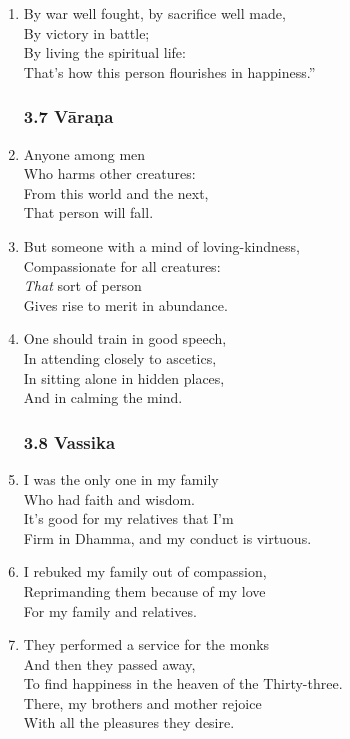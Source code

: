 \documentclass[10pt, openany]{book}
\newcommand*{\vleftofline}[1]{\leavevmode\llap{#1}}
\begin{document}
\begin{enumerate}
\item \vleftofline{“}By war well fought, by sacrifice well made,\\
By victory in battle;\\
By living the spiritual life:\\
That’s how this person flourishes in happiness.”

\subsubsection*{3.7 Vāraṇa}

\item Anyone among men\\
Who harms other creatures:\\
From this world and the next,\\
That person will fall.

\item But someone with a mind of loving-kindness,\\
Compassionate for all creatures:\\
\emph{That} sort of person\\
Gives rise to merit in abundance.

\item One should train in good speech,\\
In attending closely to ascetics,\\
In sitting alone in hidden places,\\
And in calming the mind.

\subsubsection*{3.8 Vassika}

\item I was the only one in my family\\
Who had faith and wisdom.\\
It’s good for my relatives that I’m\\
Firm in Dhamma, and my conduct is virtuous.

\item I rebuked my family out of compassion,\\
Reprimanding them because of my love\\
For my family and relatives.

\item They performed a service for the monks\\
And then they passed away,\\
To find happiness in the heaven of the Thirty-three.\\
There, my brothers and mother rejoice\\
With all the pleasures they desire.


\end{enumerate}
\end{document}
